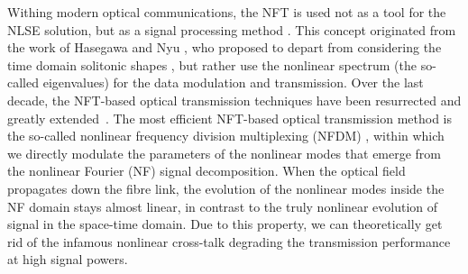 Withing modern optical communications, the NFT is used not as a tool for the NLSE solution, but as a signal processing method \cite{tplwfkd17,yk14-1}. This concept originated from the work of Hasegawa and Nyu \cite{hn93}, who proposed to depart from considering the time domain solitonic shapes \cite{mg06}, but rather use the nonlinear spectrum (the so-called eigenvalues) for the data modulation and transmission. Over the last decade, the NFT-based optical transmission techniques have been resurrected and greatly extended~\cite{tplwfkd17,yal19}. The most efficient NFT-based optical transmission method is the so-called nonlinear frequency division multiplexing (NFDM) \cite{yk14-1}, within which we directly modulate the parameters of the nonlinear modes that emerge from the nonlinear Fourier (NF) signal decomposition. When the optical field propagates down the fibre link, the evolution of the nonlinear modes inside the NF domain stays almost linear, in contrast to the truly nonlinear evolution of signal in the space-time domain. Due to this property, we can theoretically get rid of the infamous nonlinear cross-talk degrading the transmission performance at high signal powers\cite{ekw10}. 

